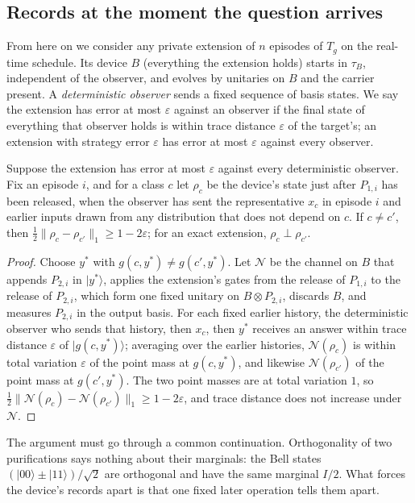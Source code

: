 \subsection{Records at the moment the question arrives}

From here on we consider any private extension of $n$ episodes of $T_g$ on the real-time schedule. Its device $B$ (everything the extension holds) starts in $\tau_B$, independent of the observer, and evolves by unitaries on $B$ and the carrier present. A \emph{deterministic observer} sends a fixed sequence of basis states. We say the extension has error at most $\varepsilon$ against an observer if the final state of everything that observer holds is within trace distance $\varepsilon$ of the target's; an extension with strategy error $\varepsilon$ has error at most $\varepsilon$ against every observer.

\begin{lemma}\label{lem:classes-orth}
Suppose the extension has error at most $\varepsilon$ against every deterministic observer. Fix an episode $i$, and for a class $c$ let $\rho_c$ be the device's state just after $P_{1,i}$ has been released, when the observer has sent the representative $x_c$ in episode $i$ and earlier inputs drawn from any distribution that does not depend on $c$. If $c\ne c'$, then $\tfrac12\|\rho_c-\rho_{c'}\|_1\ge1-2\varepsilon$; for an exact extension, $\rho_c\perp\rho_{c'}$.
\end{lemma}
\begin{proof}
Choose $y^*$ with $g(c,y^*)\ne g(c',y^*)$. Let $\mathcal N$ be the channel on $B$ that appends $P_{2,i}$ in $|y^*\rangle$, applies the extension's gates from the release of $P_{1,i}$ to the release of $P_{2,i}$, which form one fixed unitary on $B\otimes P_{2,i}$, discards $B$, and measures $P_{2,i}$ in the output basis. For each fixed earlier history, the deterministic observer who sends that history, then $x_c$, then $y^*$ receives an answer within trace distance $\varepsilon$ of $|g(c,y^*)\rangle$; averaging over the earlier histories, $\mathcal N(\rho_c)$ is within total variation $\varepsilon$ of the point mass at $g(c,y^*)$, and likewise $\mathcal N(\rho_{c'})$ of the point mass at $g(c',y^*)$. The two point masses are at total variation $1$, so $\tfrac12\|\mathcal N(\rho_c)-\mathcal N(\rho_{c'})\|_1\ge1-2\varepsilon$, and trace distance does not increase under $\mathcal N$.
\end{proof}

\begin{remark}
The argument must go through a common continuation. Orthogonality of two purifications says nothing about their marginals: the Bell states $(|00\rangle\pm|11\rangle)/\sqrt2$ are orthogonal and have the same marginal $I/2$. What forces the device's records apart is that one fixed later operation tells them apart.
\end{remark}

